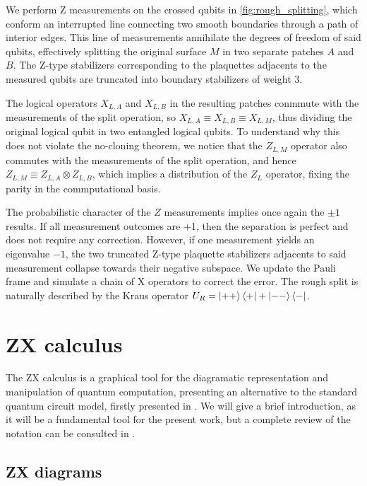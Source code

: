 \documentclass[12pt, twoside, openany]{book}
\begin{document}
We perform Z measurements on the crossed qubits in \ref{fig:rough_splitting}, which conform an interrupted line connecting two smooth boundaries through a path of interior edges. This line of measurements annihilate the degrees of freedom of said qubits, effectively splitting the original surface $M$ in two separate patches $A$ and $B$. The Z-type stabilizers corresponding to the plaquettes adjacents to the measured qubits are truncated into boundary stabilizers of weight 3. 

The logical operators $X_{L,A}$ and $X_{L,B}$ in the resulting patches conmmute with the measurements of the split operation, so $X_{L,A} \equiv X_{L,B} \equiv X_{L,M}$, thus dividing the original logical qubit in two entangled logical qubits. To understand why this does not violate the no-cloning theorem, we notice that the $Z_{L,M}$ operator also commutes with the measurements of the split operation, and hence $Z_{L,M} \equiv Z_{L,A} \otimes Z_{L,B}$, which implies a distribution of the $Z_L$ operator, fixing the parity in the commputational basis. 

The probabilistic character of the $Z$ measurements implies once again the $\pm1$ results. If all measurement outcomes are +1, then the separation is perfect and does not require any correction. However, if one measurement yields an eigenvalue $-1$, the two truncated Z-type plaquette stabilizers adjacents to said measurement collapse towards their negative subspace. We update the Pauli frame and simulate a chain of X operators to correct the error. The rough split is naturally described by the Kraus operator $U_R = \ket{++} \bra{+} + \ket{--} \bra{-}$.

\chapter{ZX calculus}

The ZX calculus is a graphical tool for the diagramatic representation and manipulation of quantum computation, presenting an alternative to the standard quantum circuit model, firstly presented in \cite{Coecke_2011}. We will give a brief introduction, as it will be a fundamental tool for the present work, but a complete review of the notation can be consulted in \cite{KissingerWetering2024Book}.

\section{ZX diagrams}
\end{document}
